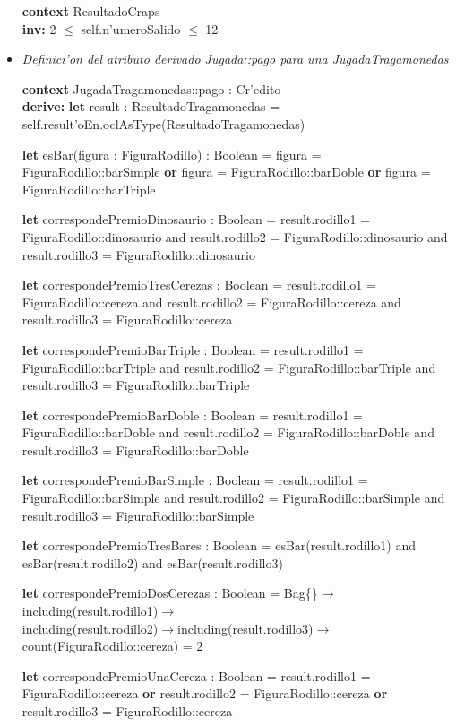 \begin{itemize}
\textbf{context} ResultadoCraps \\ \textbf{inv:}
    2 $\leq$ self.n'umeroSalido $\leq$ 12



\item \textit{Definici'on del atributo derivado Jugada::pago para una JugadaTragamonedas}

\textbf{context} JugadaTragamonedas::pago : Cr'edito \\ \textbf{derive:}
    \textbf{let} result : ResultadoTragamonedas = self.result'oEn.oclAsType(ResultadoTragamonedas)

    \textbf{let} esBar(figura : FiguraRodillo) : Boolean = figura = FiguraRodillo::barSimple \textbf{or} figura = FiguraRodillo::barDoble \textbf{or} figura = FiguraRodillo::barTriple

    \textbf{let} correspondePremioDinosaurio : Boolean = result.rodillo1 = FiguraRodillo::dinosaurio and result.rodillo2 = FiguraRodillo::dinosaurio and result.rodillo3 = FiguraRodillo::dinosaurio
    
    \textbf{let} correspondePremioTresCerezas : Boolean = result.rodillo1 = FiguraRodillo::cereza and result.rodillo2 = FiguraRodillo::cereza and result.rodillo3 = FiguraRodillo::cereza
    
    \textbf{let} correspondePremioBarTriple : Boolean = result.rodillo1 = FiguraRodillo::barTriple and result.rodillo2 = FiguraRodillo::barTriple and result.rodillo3 = FiguraRodillo::barTriple
    
    \textbf{let} correspondePremioBarDoble : Boolean = result.rodillo1 = FiguraRodillo::barDoble and result.rodillo2 = FiguraRodillo::barDoble and result.rodillo3 = FiguraRodillo::barDoble
    
    \textbf{let} correspondePremioBarSimple : Boolean = result.rodillo1 = FiguraRodillo::barSimple and result.rodillo2 = FiguraRodillo::barSimple and result.rodillo3 = FiguraRodillo::barSimple
    
    \textbf{let} correspondePremioTresBares : Boolean = esBar(result.rodillo1) and esBar(result.rodillo2) and esBar(result.rodillo3)
    
    \textbf{let} correspondePremioDosCerezas : Boolean = Bag\{\}$\rightarrow$including(result.rodillo1)$\rightarrow$\\including(result.rodillo2)$\rightarrow$including(result.rodillo3)$\rightarrow$count(FiguraRodillo::cereza) = 2
    
    \textbf{let} correspondePremioUnaCereza : Boolean = result.rodillo1 = FiguraRodillo::cereza \textbf{or} result.rodillo2 = FiguraRodillo::cereza \textbf{or} result.rodillo3 = FiguraRodillo::cereza
    

\end{itemize}

